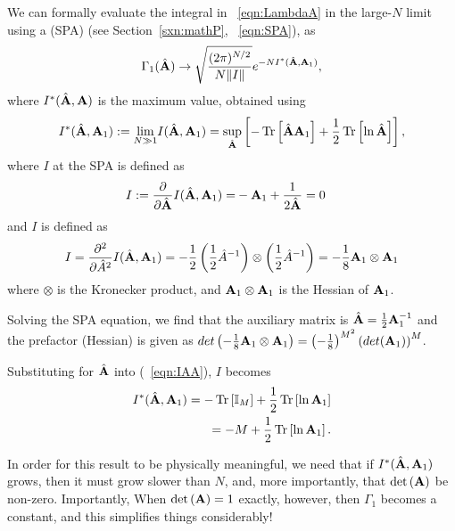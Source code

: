 We can formally evaluate the integral in \EQN~\ref{eqn:LambdaA} in the large-$N$ limit using a \SaddlePointApproximation (SPA)
(see Section~\ref{sxn:mathP}, \EQN~\ref{eqn:SPA}), as
\begin{align}
\label{eqn:LAMBDA}
\Gamma_1(\hat{\mathbf{A}})\rightarrow \sqrt{\dfrac{(2\pi)^{N/2}}{N\Vert I\Vert}}e^{-N I^{*}(\hat{\mathbf{A}}, \mathbf{A}_{1})}  ,
\end{align}
where $I^{*}(\hat{\mathbf{A}},\mathbf{A})$ is the maximum value, obtained using
\begin{align}
  \label{eqn:IAA-sup}
  I^{*}(\hat{\mathbf{A}},\mathbf{A}_{1}) :=
\underset{N\gg 1}{\lim} I(\hat{\mathbf{A}},\mathbf{A}_{1}) =
 \underset{\hat{\mathbf{A}}}{\sup}\left[-\mbox{}\operatorname{Tr}\left[\hat{\mathbf{A}}\mathbf{A}_{1}\right]+\frac{1}{2}\mbox{}\operatorname{Tr}\left[\ln\hat{\mathbf{A}}\right]\right]  ,
\end{align}
where $I$ at the SPA is defined as
\begin{align}
  \label{eqn:SP0}
  I:=   \dfrac{\partial}{\partial\hat{\mathbf{A}}}I(\hat{\mathbf{A}},\mathbf{A}_{1}) =& -\mathbf{A}_{1}+\dfrac{1}{2\hat{\mathbf{A}}}=0  
\end{align}
and  $I$ is defined as
\begin{align}
  \label{eqn:Ixx}
I=\frac{\partial^2 }{\partial \hat{A}^2} I(\hat{\mathbf{A}},\mathbf{A}_{1})= -\frac{1}{2} \left( \frac{1}{2} \hat{A}^{-1} \right) \otimes \left( \frac{1}{2} \hat{A}^{-1} \right) = -\frac{1}{8} \mathbf{A}_{1} \otimes \mathbf{A}_{1}
\end{align}
where $\otimes$ is the Kronecker product, and $\mathbf{A}_{1} \otimes \mathbf{A}_{1}$ is the Hessian of $\mathbf{A}_{1}$.

Solving the SPA equation, we find that the auxiliary matrix is $\hat{\mathbf{A}}=\tfrac{1}{2}\mathbf{A}_{1}^{-1}$
and the prefactor (Hessian) is given as
$ det \left( -\frac{1}{8} \mathbf{A}_{1} \otimes \mathbf{A}_{1} \right) = \left( -\frac{1}{8} \right)^{M^2} \left(  det (\mathbf{A}_{1}) \right)^M$.



Substituting for $\hat{\mathbf{A}}$ into \RateFunction (\EQN~\ref{eqn:IAA}), $I$ becomes
\begin{align}
\label{eqn:IAA_2}
I^{*}(\hat{\mathbf{A}},\mathbf{A}_{1}) = -\mbox{}\operatorname{Tr}\left[ \mathbb{I}_{M} \right] + \frac{1}{2}\mbox{}\operatorname{Tr}\left[ \ln\mathbf{A}_{1} \right]   \\ \nonumber
 = -M + \frac{1}{2}\mbox{}\operatorname{Tr}\left[ \ln\mathbf{A}_{1} \right]  .
\end{align}

\noindent
In order for this result to be physically meaningful, 
we need that if $I^{*}(\hat{\mathbf{A}},\mathbf{A}_{1})$ grows,
then it must grow slower than $N$, and,
more importantly, that $\mbox{}{\text{det}}\left(\mathbf{A}\right)$ be non-zero.
Importantly, When $\mbox{}{\text{det}}\left(\mathbf{A}\right)=1$ exactly, however, then $\Gamma_1$ becomes a constant,
and this simplifies things considerably!

